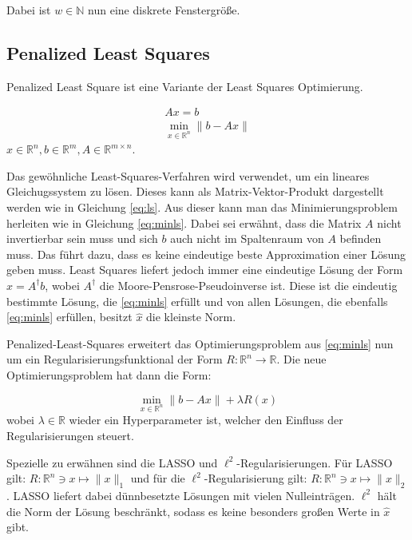 \documentclass{article}
\newcommand{\R}[0]{\mathbb{R}}
\begin{document}
Dabei ist $w \in \mathbb{N}$ nun eine diskrete Fenstergröße.

\subsection{Penalized Least Squares}
Penalized Least Square ist eine Variante der Least Squares Optimierung.

\begin{align}
    Ax = b \label{eq:ls} \\ 
    \min\limits_{x \in \R^n} \lVert b - Ax \rVert \label{eq:minls}
\end{align}
$x \in \R^n, b \in \R^m, A \in \R^{m\times n}$.

Das gewöhnliche Least-Squares-Verfahren wird verwendet, um ein lineares Gleichugssystem zu lösen. 
Dieses kann als Matrix-Vektor-Produkt dargestellt werden wie in Gleichung \ref{eq:ls}. 
Aus dieser kann man das Minimierungsproblem herleiten wie in Gleichung \ref{eq:minls}.
Dabei sei erwähnt, dass die Matrix $A$ nicht invertierbar sein muss und sich $b$ auch nicht im Spaltenraum von $A$ befinden muss.
Das führt dazu, dass es keine eindeutige beste Approximation einer Lösung geben muss.
Least Squares liefert jedoch immer eine eindeutige Lösung der Form $\hat{x} = A^{\dagger} b$, wobei $A^{\dagger}$ die Moore-Pensrose-Pseudoinverse ist.
Diese ist die eindeutig bestimmte Lösung, die \ref{eq:minls} erfüllt und von allen Lösungen, die ebenfalls \ref{eq:minls} erfüllen, besitzt $\hat{x}$ die kleinste Norm.

Penalized-Least-Squares erweitert das Optimierungsproblem aus \ref{eq:minls} nun um ein Regularisierungsfunktional der Form $R: \R^n \to \R$.
Die neue Optimierungsproblem hat dann die Form:

\begin{equation}
    \min\limits_{x \in \R^n} \lVert b - Ax \rVert + \lambda R(x)
\end{equation}
wobei $\lambda \in \R$ wieder ein Hyperparameter ist, welcher den Einfluss der Regularisierungen steuert.

Spezielle zu erwähnen sind die LASSO und $\ell^2$-Regularisierungen. Für LASSO gilt: $R: \R^n \ni x \mapsto \lVert x \rVert_1$ und für die $\ell^2$-Regularisierung gilt: $R: \R^n \ni x \mapsto \lVert x \rVert_2$.
LASSO liefert dabei dünnbesetzte Lösungen mit vielen Nulleinträgen. 
$\ell^2$ hält die Norm der Lösung beschränkt, sodass es keine besonders großen Werte in $\hat{x}$ gibt.

\cite[S. 184f.]{strang2019linear}
\end{document}
